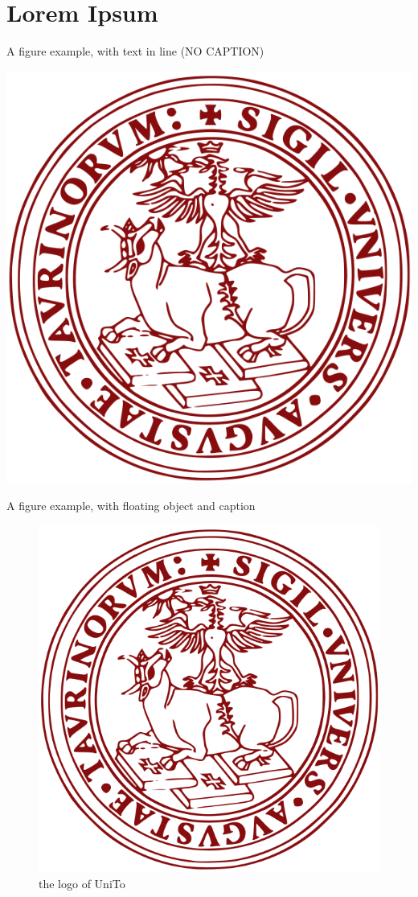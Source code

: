 \chapter[Chapter name for Index]{Lorem Ipsum}

A figure example, with text in line (NO CAPTION)
\begin{center}

\includegraphics[scale=0.15]{pictures/logo.png}


\end{center}

A figure example, with floating object and caption

\begin{figure}
\centering

\includegraphics[scale=0.15]{pictures/logo.png}
\caption{the logo of UniTo}

\end{figure}
